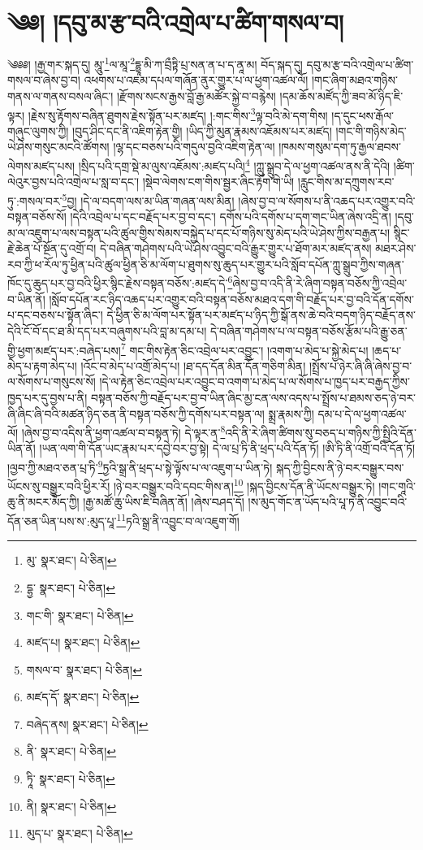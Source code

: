 \setcounter{footnote}{0} 
\chapter{༄༅། །དབུ་མ་རྩ་བའི་འགྲེལ་པ་ཚིག་གསལ་བ།}༄༅༅། །རྒྱ་གར་སྐད་དུ། མཱུ་\footnote{མུ་  སྣར་ཐང་།  པེ་ཅིན། }ལ་མཱ་\footnote{དྷྱ་  སྣར་ཐང་།  པེ་ཅིན། }དྷྱཱ་མི་ཀ་བྲྀཏྟི་པྲ་སན་ན་པ་ད་ནཱ་མ། བོད་སྐད་དུ། དབུ་མ་རྩ་བའི་འགྲེལ་པ་ཚིག་གསལ་བ་ཞེས་བྱ་བ། འཕགས་པ་འཇམ་དཔལ་གཞོན་ནུར་གྱུར་པ་ལ་ཕྱག་འཚལ་ལོ། །གང་ཞིག་མཐའ་གཉིས་གནས་ལ་གནས་བསལ་ཞིང་། །རྫོགས་སངས་རྒྱས་བློ་རྒྱ་མཚོར་སྐྱེ་བ་བརྙེས། །དམ་ཆོས་མཛོད་ཀྱི་ཟབ་མོ་ཉིད་ཇི་ལྟར། །རྗེས་སུ་རྟོགས་བཞིན་ཐུགས་རྗེས་སྟོན་པར་མཛད། །:གང་གིས་\footnote{གང་གི་  སྣར་ཐང་།  པེ་ཅིན། }ལྟ་བའི་མེ་དག་གིས། །ད་དུང་ཕས་རྒོལ་གཞུང་ལུགས་ཀྱི། །བུད་ཤིང་དང་ནི་འཇིག་རྟེན་གྱི། །ཡིད་ཀྱི་མུན་རྣམས་འཇོམས་པར་མཛད། །གང་གི་གཉིས་མེད་ཡེ་ཤེས་གསུང་མངའི་ཚོགས། །ལྷ་དང་བཅས་པའི་གདུལ་བྱའི་འཇིག་རྟེན་ལ། །ཁམས་གསུམ་དག་ཏུ་རྒྱལ་ཐབས་ལེགས་མཛད་པས། །སྲིད་པའི་དགྲ་སྡེ་མ་ལུས་འཇོམས་:མཛད་པའི།\footnote{མཛད་པ།  སྣར་ཐང་།  པེ་ཅིན། } །ཀླུ་སྒྲུབ་དེ་ལ་ཕྱག་འཚལ་ནས་ནི་དེའི། །ཚིག་ལེའུར་བྱས་པའི་འགྲེལ་པ་སླ་བ་དང་། །སྡེབ་ལེགས་ངག་གིས་སྦྱར་ཞིང་རྟོག་གེ་ཡི། །རླུང་གིས་མ་དཀྲུགས་རབ་ཏུ་:གསལ་བར་\footnote{གསལ་བ་  སྣར་ཐང་།  པེ་ཅིན། }བྱ། །དེ་ལ་བདག་ལས་མ་ཡིན་གཞན་ལས་མིན། །ཞེས་བྱ་བ་ལ་སོགས་པ་ནི་འཆད་པར་འགྱུར་བའི་བསྟན་བཅོས་སོ། །དེའི་འབྲེལ་པ་དང་བརྗོད་པར་བྱ་བ་དང་། དགོས་པའི་དགོས་པ་དག་གང་ཡིན་ཞེས་འདྲི་ན། །དབུ་མ་ལ་འཇུག་པ་ལས་བསྟན་པའི་ཚུལ་གྱིས་སེམས་བསྐྱེད་པ་དང་པོ་གཉིས་སུ་མེད་པའི་ཡེ་ཤེས་ཀྱིས་བརྒྱན་པ། སྙིང་རྗེ་ཆེན་པོ་སྔོན་དུ་འགྲོ་བ། དེ་བཞིན་གཤེགས་པའི་ཡེ་ཤེས་འབྱུང་བའི་རྒྱུར་གྱུར་པ་ཐོག་མར་མཛད་ནས། མཐར་ཤེས་རབ་ཀྱི་ཕ་རོལ་ཏུ་ཕྱིན་པའི་ཚུལ་ཕྱིན་ཅི་མ་ལོག་པ་ཐུགས་སུ་ཆུད་པར་གྱུར་པའི་སློབ་དཔོན་ཀླུ་སྒྲུབ་ཀྱིས་གཞན་ཁོང་དུ་ཆུད་པར་བྱ་བའི་ཕྱིར་སྙིང་རྗེས་བསྟན་བཅོས་:མཛད་དེ་\footnote{མཛད་དོ་  སྣར་ཐང་།  པེ་ཅིན། }ཞེས་བྱ་བ་འདི་ནི་རེ་ཞིག་བསྟན་བཅོས་ཀྱི་འབྲེལ་བ་ཡིན་ནོ། །སློབ་དཔོན་རང་ཉིད་འཆད་པར་འགྱུར་བའི་བསྟན་བཅོས་མཐའ་དག་གི་བརྗོད་པར་བྱ་བའི་དོན་དགོས་པ་དང་བཅས་པ་སྟོན་ཞིང་། དེ་ཕྱིན་ཅི་མ་ལོག་པར་སྟོན་པར་མཛད་པ་ཉིད་ཀྱི་སྒོ་ནས་ཆེ་བའི་བདག་ཉིད་བརྗོད་ནས་དེའི་ངོ་བོ་དང་ཐ་མི་དད་པར་བཞུགས་པའི་བླ་མ་དམ་པ། དེ་བཞིན་གཤེགས་པ་ལ་བསྟན་བཅོས་རྩོམ་པའི་རྒྱུ་ཅན་གྱི་ཕྱག་མཛད་པར་:བཞེད་པས།\footnote{བཞེད་ནས།  སྣར་ཐང་།  པེ་ཅིན། } གང་གིས་རྟེན་ཅིང་འབྲེལ་པར་འབྱུང་། །འགག་པ་མེད་པ་སྐྱེ་མེད་པ། །ཆད་པ་མེད་པ་རྟག་མེད་པ། །འོང་བ་མེད་པ་འགྲོ་མེད་པ། །ཐ་དད་དོན་མིན་དོན་གཅིག་མིན། །སྤྲོས་པ་ཉེར་ཞི་ཞི་ཞེས་བྱ་བ་ལ་སོགས་པ་གསུངས་སོ། །དེ་ལ་རྟེན་ཅིང་འབྲེལ་པར་འབྱུང་བ་འགག་པ་མེད་པ་ལ་སོགས་པ་ཁྱད་པར་བརྒྱད་ཀྱིས་ཁྱད་པར་དུ་བྱས་པ་ནི། བསྟན་བཅོས་ཀྱི་བརྗོད་པར་བྱ་བ་ཡིན་ཞིང་མྱ་ངན་ལས་འདས་པ་སྤྲོས་པ་ཐམས་ཅད་ཉེ་བར་ཞི་ཞིང་ཞི་བའི་མཚན་ཉིད་ཅན་ནི་བསྟན་བཅོས་ཀྱི་དགོས་པར་བསྟན་ལ། སྨྲ་རྣམས་ཀྱི། དམ་པ་དེ་ལ་ཕྱག་འཚལ་ལོ། །ཞེས་བྱ་བ་འདིས་ནི་ཕྱག་འཚལ་བ་བསྟན་ཏེ། དེ་ལྟར་ན་\footnote{ནི་  སྣར་ཐང་།  པེ་ཅིན། }འདི་ནི་རེ་ཞིག་ཚིགས་སུ་བཅད་པ་གཉིས་ཀྱི་སྤྱིའི་དོན་ཡིན་ནོ། །ཡན་ལག་གི་དོན་ཡང་རྣམ་པར་དབྱེ་བར་བྱ་སྟེ། དེ་ལ་པྲ་ཏི་ནི་ཕྲད་པའི་དོན་ཏོ། །ཨི་ཏི་ནི་འགྲོ་བའི་དོན་ཏོ། །ལྱབ་ཀྱི་མཐའ་ཅན་པྲ་ཏི་\footnote{ཏཱི་  སྣར་ཐང་།  པེ་ཅིན། }ཏྱའི་སྒྲ་ནི་ཕྲད་པ་སྟེ་ལྟོས་པ་ལ་འཇུག་པ་ཡིན་ཏེ། སྐད་ཀྱི་བྱིངས་ནི་ཉེ་བར་བསྒྱུར་བས་ཡོངས་སུ་བསྒྱུར་བའི་ཕྱིར་རོ། །ཉེ་བར་བསྒྱུར་བའི་དབང་གིས་ན།\footnote{ནི།  སྣར་ཐང་།  པེ་ཅིན། } །སྐད་བྱིངས་དོན་ནི་ཡོངས་བསྒྱུར་ཏེ། །གང་གཱའི་ཆུ་ནི་མངར་མོད་ཀྱི། །རྒྱ་མཚོ་ཆུ་ཡིས་ཇི་བཞིན་ནོ། །ཞེས་བཤད་དོ། །ས་མུད་གོང་ན་ཡོད་པའི་པཱ་ཏ་ནི་འབྱུང་བའི་དོན་ཅན་ཡིན་པས་ས་:མུད་པཱ་\footnote{མུད་པ་  སྣར་ཐང་།  པེ་ཅིན། }ཏའི་སྒྲ་ནི་འབྱུང་བ་ལ་འཇུག་གོ། 